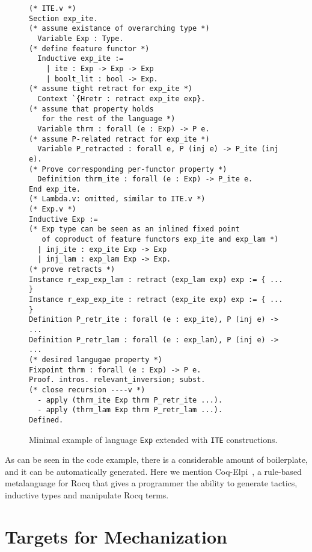 \documentclass[sigplan,nonacm,review]{acmart}
\begin{document}
\begin{figure}
\begin{lstlisting}[language=Coq]
(* ITE.v *)
Section exp_ite.
(* assume existance of overarching type *)
  Variable Exp : Type.
(* define feature functor *)
  Inductive exp_ite := 
    | ite : Exp -> Exp -> Exp
    | boolt_lit : bool -> Exp.
(* assume tight retract for exp_ite *)
  Context `{Hretr : retract exp_ite exp}.
(* assume that property holds 
   for the rest of the language *)
  Variable thrm : forall (e : Exp) -> P e.
(* assume P-related retract for exp_ite *)
  Variable P_retracted : forall e, P (inj e) -> P_ite (inj e).
(* Prove corresponding per-functor property *)
  Definition thrm_ite : forall (e : Exp) -> P_ite e.
End exp_ite.
(* Lambda.v: omitted, similar to ITE.v *)
(* Exp.v *)
Inductive Exp := 
(* Exp type can be seen as an inlined fixed point 
   of coproduct of feature functors exp_ite and exp_lam *)
  | inj_ite : exp_ite Exp -> Exp
  | inj_lam : exp_lam Exp -> Exp.
(* prove retracts *)
Instance r_exp_exp_lam : retract (exp_lam exp) exp := { ... }
Instance r_exp_exp_ite : retract (exp_ite exp) exp := { ... }
Definition P_retr_ite : forall (e : exp_ite), P (inj e) -> ...
Definition P_retr_lam : forall (e : exp_lam), P (inj e) -> ...
(* desired langugae property *)
Fixpoint thrm : forall (e : Exp) -> P e.
Proof. intros. relevant_inversion; subst.
(* close recursion ----v *)
  - apply (thrm_ite Exp thrm P_retr_ite ...).
  - apply (thrm_lam Exp thrm P_retr_lam ...).
Defined.
\end{lstlisting}
  \caption{Minimal example of language \texttt{Exp} extended with \texttt{ITE} constructions. }
  \label{fig:alacart_example}
\end{figure}



As can be seen in the code example,
there is a considerable amount of boilerplate,
and it can be automatically generated.
Here we mention Coq-Elpi~\cite{tassi2025elpi}, a rule-based metalanguage for Rocq that
gives a programmer the ability to generate tactics,
inductive types and manipulate Rocq terms.



\section{Targets for Mechanization}
\end{document}
